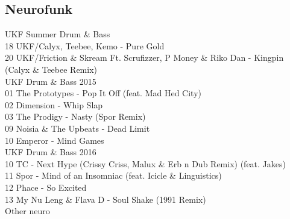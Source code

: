 \begin{multicols}{2}
 \subsection*{Neurofunk}
 \large UKF Summer Drum \& Bass \normalsize\\
 18 UKF/Calyx, Teebee, Kemo - Pure Gold\\ 20 UKF/Friction \& Skream Ft. Scrufizzer, P Money \& Riko Dan - Kingpin (Calyx \& Teebee Remix)\\
 \large UKF Drum \& Bass 2015 \normalsize\\
 01 The Prototypes - Pop It Off (feat. Mad Hed City)\\ 02 Dimension - Whip Slap\\ 03 The Prodigy - Nasty (Spor Remix)\\ 09 Noisia \& The Upbeats - Dead Limit\\ 10 Emperor - Mind Games\\
 \large UKF Drum \& Bass 2016 \normalsize\\
 10 TC - Next Hype (Crissy Criss, Malux \& Erb n Dub Remix) (feat. Jakes)\\ 11 Spor - Mind of an Insomniac (feat. Icicle \& Linguistics)\\ 12 Phace - So Excited\\ 13 My Nu Leng \& Flava D - Soul Shake (1991 Remix)\\
 \large Other neuro \normalsize\\

\end{multicols}
